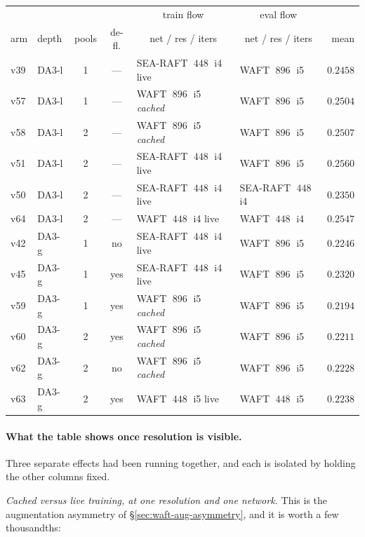 \documentclass[11pt,a4paper]{article}
\begin{document}
\begin{center}\small
\begin{tabular}{llccll r}
\toprule
& & & & \multicolumn{1}{c}{train flow} & \multicolumn{1}{c}{eval flow} & \\
arm & depth & pools & de-fl. & \multicolumn{1}{c}{net / res / iters} & \multicolumn{1}{c}{net / res / iters} & mean \\
\midrule
v39 & DA3-l & 1 & ---  & SEA-RAFT $\;448\;$ i4 live   & WAFT $\;896\;$ i5 & $0.2458$ \\
v57 & DA3-l & 1 & ---  & WAFT $\;896\;$ i5 \emph{cached} & WAFT $\;896\;$ i5 & $0.2504$ \\
v58 & DA3-l & 2 & ---  & WAFT $\;896\;$ i5 \emph{cached} & WAFT $\;896\;$ i5 & $0.2507$ \\
v51 & DA3-l & 2 & ---  & SEA-RAFT $\;448\;$ i4 live   & WAFT $\;896\;$ i5 & $\mathbf{0.2560}$ \\
v50 & DA3-l & 2 & ---  & SEA-RAFT $\;448\;$ i4 live   & SEA-RAFT $\;448\;$ i4 & $0.2350$ \\
v64 & DA3-l & 2 & ---  & WAFT $\;448\;$ i4 live       & WAFT $\;448\;$ i4 & $0.2547$ \\
\midrule
v42 & DA3-g & 1 & no   & SEA-RAFT $\;448\;$ i4 live   & WAFT $\;896\;$ i5 & $0.2246$ \\
v45 & DA3-g & 1 & yes  & SEA-RAFT $\;448\;$ i4 live   & WAFT $\;896\;$ i5 & $\mathbf{0.2320}$ \\
v59 & DA3-g & 1 & yes  & WAFT $\;896\;$ i5 \emph{cached} & WAFT $\;896\;$ i5 & $0.2194$ \\
v60 & DA3-g & 2 & yes  & WAFT $\;896\;$ i5 \emph{cached} & WAFT $\;896\;$ i5 & $0.2211$ \\
v62 & DA3-g & 2 & no   & WAFT $\;896\;$ i5 \emph{cached} & WAFT $\;896\;$ i5 & $0.2228$ \\
v63 & DA3-g & 2 & yes  & WAFT $\;448\;$ i5 live       & WAFT $\;448\;$ i5 & $0.2238$ \\
\bottomrule
\end{tabular}
\end{center}

\paragraph{What the table shows once resolution is visible.} Three separate effects had been
running together, and each is isolated by holding the other columns fixed.

\emph{Cached versus live training, at one resolution and one network.} This is the augmentation
asymmetry of \S\ref{sec:waft-aug-asymmetry}, and it is worth a few thousandths:
\end{document}
